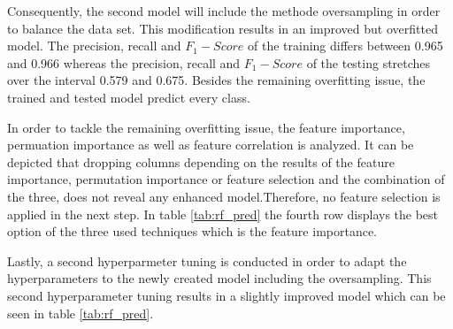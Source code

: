 Consequently, the second model will include the methode oversampling in order to balance the data set. This modification results in an improved but overfitted model. The precision, recall and $F_1-Score$ of the training differs between 0.965 and 0.966 whereas the precision, recall and $F_1-Score$ of the testing stretches over the interval 0.579 and 0.675. Besides the remaining overfitting issue, the trained and tested model predict every class.

In order to tackle the remaining overfitting issue, the feature importance, permuation importance as well as feature correlation is analyzed.\cite{Piotri2020} It can be depicted that dropping columns depending on the results of the feature importance, permutation importance or feature selection and the combination of the three, does not reveal any enhanced model.Therefore, no feature selection is applied in the next step. In table \ref{tab:rf_pred} the fourth row displays the best option of the three used techniques which is the feature importance.

Lastly, a second hyperparmeter tuning is conducted in order to adapt the hyperparameters to the newly created model including the oversampling. This second hyperparameter tuning results in a slightly improved model which can be seen in table \ref{tab:rf_pred}.




